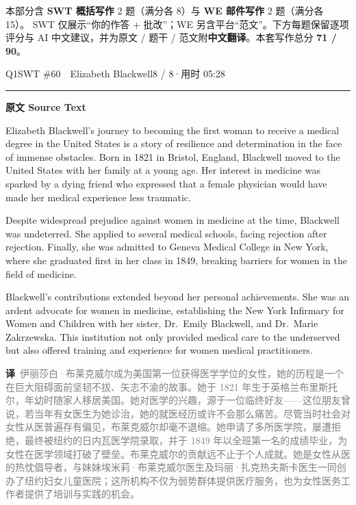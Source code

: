 \documentclass[11pt]{article}
\newcommand{\ptesub}[1]{%
  \par\needspace{2\baselineskip}\smallskip
  {\color{cAccent}\rule[-0.2ex]{3pt}{1.05em}}\hspace{6pt}%
  {\bfseries\color{cHead}#1}\par\nopagebreak\smallskip}
\newcommand{\zh}[1]{{\footnotesize\textcolor{cNote}{\textbf{译}}\ \textcolor{gray}{#1}}}
\begin{document}
\vspace{1mm}
{\small\color{gray} 本部分含 \textbf{SWT 概括写作} 2 题（满分各 8）与 \textbf{WE 邮件写作} 2 题（满分各 15）。
SWT 仅展示“你的作答 + 批改”；WE 另含平台“范文”。下方每题保留逐项评分与 AI 中文建议，并为原文 / 题干 / 范文附\textbf{中文翻译}。本套写作总分 \textbf{71 / 90}。}
\vspace{2mm}


\begin{qblock}{Q1\quad SWT \#60\ \ Elizabeth Blackwell}{8 / 8\quad·\quad 用时 05:28}

\ptesub{原文 Source Text}
\begin{promptbox}
Elizabeth Blackwell's journey to becoming the first woman to receive a medical degree in the United States is a story of resilience and determination in the face of immense obstacles. Born in 1821 in Bristol, England, Blackwell moved to the United States with her family at a young age. Her interest in medicine was sparked by a dying friend who expressed that a female physician would have made her medical experience less traumatic.

Despite widespread prejudice against women in medicine at the time, Blackwell was undeterred. She applied to several medical schools, facing rejection after rejection. Finally, she was admitted to Geneva Medical College in New York, where she graduated first in her class in 1849, breaking barriers for women in the field of medicine.

Blackwell's contributions extended beyond her personal achievements. She was an ardent advocate for women in medicine, establishing the New York Infirmary for Women and Children with her sister, Dr.\ Emily Blackwell, and Dr.\ Marie Zakrzewska. This institution not only provided medical care to the underserved but also offered training and experience for women medical practitioners.
\end{promptbox}
\zh{伊丽莎白·布莱克威尔成为美国第一位获得医学学位的女性，她的历程是一个在巨大阻碍面前坚韧不拔、矢志不渝的故事。她于 1821 年生于英格兰布里斯托尔，年幼时随家人移居美国。她对医学的兴趣，源于一位临终好友——这位朋友曾说，若当年有女医生为她诊治，她的就医经历或许不会那么痛苦。尽管当时社会对女性从医普遍存有偏见，布莱克威尔却毫不退缩。她申请了多所医学院，屡遭拒绝，最终被纽约的日内瓦医学院录取，并于 1849 年以全班第一名的成绩毕业，为女性在医学领域打破了壁垒。布莱克威尔的贡献远不止于个人成就。她是女性从医的热忱倡导者，与妹妹埃米莉·布莱克威尔医生及玛丽·扎克热夫斯卡医生一同创办了纽约妇女儿童医院；这所机构不仅为弱势群体提供医疗服务，也为女性医务工作者提供了培训与实践的机会。}


\end{qblock}
\end{document}
